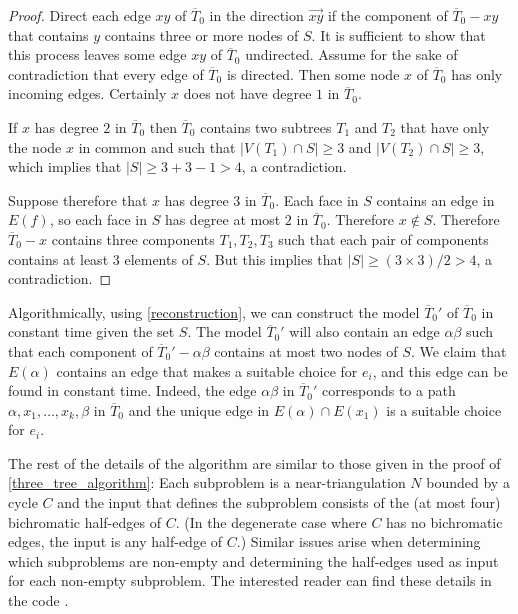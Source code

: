 \documentclass{patmorin}
\begin{document}
\begin{proof}
  Direct each edge $xy$ of $\overline{T}_0$ in the direction $\overrightarrow{xy}$ if the component of $\overline{T}_0-xy$ that contains $y$ contains three or more nodes of $S$.  It is sufficient to show that this process leaves some edge $xy$ of $\overline{T}_0$ undirected.  Assume for the sake of contradiction that every edge of $\overline{T}_0$ is directed.  Then some node $x$ of $\overline{T}_0$ has only incoming edges. Certainly $x$ does not have degree $1$ in $\overline{T}_0$.

  If $x$ has degree $2$ in $\overline{T}_0$ then $\overline{T}_0$ contains two subtrees $T_1$ and $T_2$ that have only the node $x$ in common and such that $|V(T_1)\cap S|\ge 3$ and $|V(T_2)\cap S|\ge 3$, which implies that $|S|\ge 3+3-1 > 4$, a contradiction.

  Suppose therefore that $x$ has degree $3$ in $\overline{T}_0$.  Each face in $S$ contains an edge in $E(f)$, so each face in $S$ has degree at most $2$ in $\overline{T}_0$.  Therefore $x\not\in S$.  Therefore $\overline{T}_0-x$ contains three components $T_1, T_2, T_3$ such that each pair of components contains at least $3$ elements of $S$.  But this implies that $|S|\ge (3\times 3)/2>4$, a contradiction.
\end{proof}



Algorithmically, using \cref{reconstruction}, we can construct the model $\overline{T}_0'$ of $\overline{T}_0$ in constant time given the set $S$.  The model $\overline{T}_0'$ will also contain an edge $\alpha\beta$ such that each component of $\overline{T}_0'-\alpha\beta$ contains at most two nodes of $S$. We claim that $E(\alpha)$ contains an edge that makes a suitable choice for $e_i$, and this edge can be found in constant time.  Indeed, the edge $\alpha\beta$ in  $\overline{T}_0'$ corresponds to a path $\alpha,x_1,\ldots,x_k,\beta$ in $\overline{T}_0$ and the unique edge in $E(\alpha)\cap E(x_1)$ is a suitable choice for $e_i$.  

The rest of the details of the algorithm are similar to those given in the proof of \cref{three_tree_algorithm}:  Each subproblem is a near-triangulation $N$ bounded by a cycle $C$ and the input that defines the subproblem consists of the (at most four) bichromatic half-edges of $C$.
(In the degenerate case where $C$ has no bichromatic edges, the input is any half-edge of $C$.)
Similar issues arise when determining which subproblems are non-empty and determining the half-edges used as input for each non-empty subproblem.  The interested reader can find these details in the code \cite{morin:fatripar,gouin:planar}.
\end{document}
